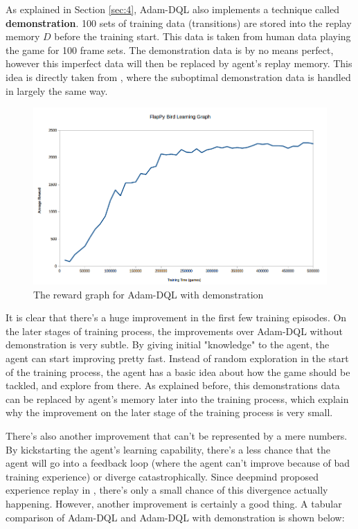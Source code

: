     As explained in Section \ref{sec:4}, Adam-DQL also implements a technique called \textbf{demonstration}. 100 sets of training data (transitions) are stored into the replay memory $D$ before the training start. This data is taken from human data playing the game for 100 frame sets. The demonstration data is by no means perfect, however this imperfect data will then be replaced by agent's replay memory. This idea is directly taken from \cite{DBLP:journals/corr/abs-1709-10089}, where the suboptimal demonstration data is handled in largely the same way.
    
       \begin{figure}[H]
        \centering
        \includegraphics[scale=0.5]{images/flappyrewardemo.png}
        \caption{The reward graph for Adam-DQL with demonstration}
        \label{fig:flappy4}
    \end{figure}
    
    It is clear that there's a huge improvement in the first few training episodes. On the later stages of training process, the improvements over Adam-DQL without demonstration is very subtle. By giving initial "knowledge" to the agent, the agent can start improving pretty fast. Instead of random exploration in the start of the training process, the agent has a basic idea about how the game should be tackled, and explore from there. As explained before, this demonstrations data can be replaced by agent's memory later into the training process, which explain why the improvement on the later stage of the training process is very small. 
    \par
    There's also another improvement that can't be represented by a mere numbers. By kickstarting the agent's learning capability, there's a less chance that the agent will go into a feedback loop (where the agent can't improve because of bad training experience) or diverge catastrophically. Since deepmind proposed experience replay in \cite{mnih2015humanlevel}, there's only a small chance of this divergence actually happening. However, another improvement is certainly a good thing. A tabular comparison of Adam-DQL and Adam-DQL with demonstration is shown below:
    
